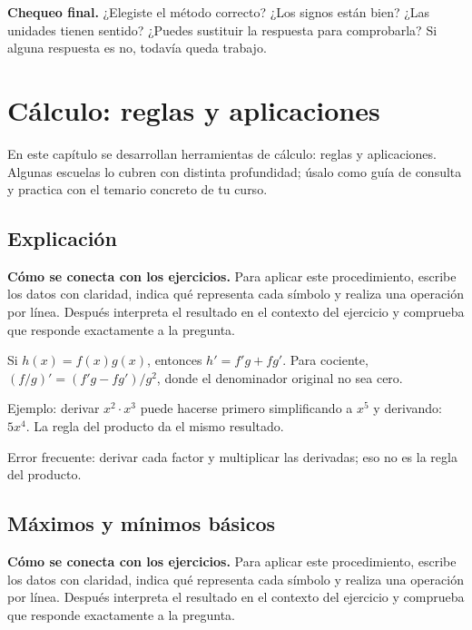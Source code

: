 \documentclass[10pt,oneside,openany]{book}
\begin{document}
\begin{idea}\textbf{Chequeo final.} ¿Elegiste el método correcto? ¿Los signos están bien? ¿Las unidades tienen sentido? ¿Puedes sustituir la respuesta para comprobarla? Si alguna respuesta es no, todavía queda trabajo.\end{idea}



\chapter{Cálculo: reglas y aplicaciones}

\begin{idea}
En este capítulo se desarrollan herramientas de cálculo: reglas y aplicaciones. Algunas escuelas lo cubren con distinta profundidad; úsalo como guía de consulta y practica con el temario concreto de tu curso.
\end{idea}

\section{Explicación}

\textbf{Cómo se conecta con los ejercicios.} Para aplicar este procedimiento, escribe los datos con claridad, indica qué representa cada símbolo y realiza una operación por línea. Después interpreta el resultado en el contexto del ejercicio y comprueba que responde exactamente a la pregunta.

Si $h(x)=f(x)g(x)$, entonces $h'=f'g+fg'$. Para cociente, $(f/g)'=(f'g-fg')/g^2$, donde el denominador original no sea cero.



\begin{ejemplo}
Ejemplo: derivar $x^2\cdot x^3$ puede hacerse primero simplificando a $x^5$ y derivando: $5x^4$. La regla del producto da el mismo resultado.
\end{ejemplo}

\begin{ojo}
Error frecuente: derivar cada factor y multiplicar las derivadas; eso no es la regla del producto.
\end{ojo}



\section{Máximos y mínimos básicos}

\textbf{Cómo se conecta con los ejercicios.} Para aplicar este procedimiento, escribe los datos con claridad, indica qué representa cada símbolo y realiza una operación por línea. Después interpreta el resultado en el contexto del ejercicio y comprueba que responde exactamente a la pregunta.
\end{document}
